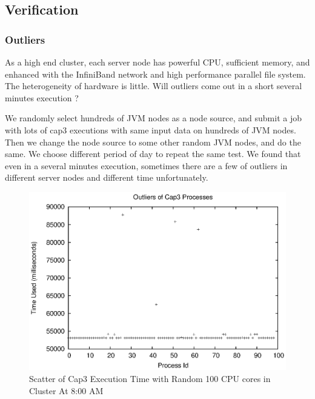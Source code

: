 \subsection{Verification}

\subsubsection{Outliers}
As a high end cluster, each server node has powerful CPU, sufficient memory, and enhanced with the InfiniBand network and high performance parallel file system. The heterogeneity of hardware is little. Will outliers come out in a short several minutes execution ?

We randomly select hundreds of JVM nodes as a node source, and submit a job with lots of cap3 executions with same input data on hundreds of JVM nodes. Then we change the node source to some other random JVM nodes, and do the same. We choose different period of day to repeat the same test. We found that even in a several minutes execution, sometimes there are a few of outliers in different server nodes and different time unfortunately.

\begin{figure}
\centering
\includegraphics[width=0.9\columnwidth]{figures/outliers.eps}
\caption{Scatter of Cap3 Execution Time with Random 100 CPU cores in Cluster At 8:00 AM}
\label{figure:outlier}
\end{figure}

